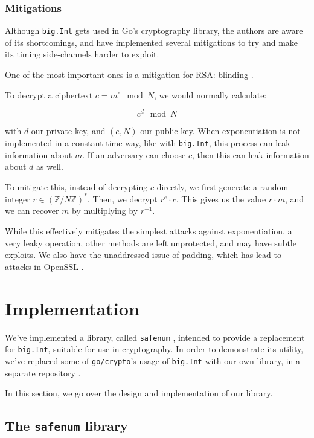 \documentclass[11pt, a4paper]{article} %
\begin{document}
{\subsubsection{Mitigations}

Although \texttt{big.Int} gets used in Go's cryptography library,
the authors are aware of its shortcomings, and have implemented
several mitigations to try and make its timing side-channels harder to
exploit.

One of the most important ones is a mitigation
for RSA: blinding \cite{kocher_timing_1996}.

To decrypt a ciphertext
$c = m^e \mod N$, we would normally calculate:

$$
c^d \mod N
$$

with $d$ our private key, and $(e, N)$ our public key.
When exponentiation is not implemented in a constant-time way, like
with \texttt{big.Int}, this process can leak information about $m$.
If an adversary can choose $c$, then this can leak information about
$d$ as well.

To mitigate this, instead of decrypting $c$ directly,
we first generate a random integer
$r \in (\mathbb{Z}/N\mathbb{Z})^*$. Then, we decrypt $r^e \cdot c$.
This gives us the value $r \cdot m$, and we can recover
$m$ by multiplying by $r^{-1}$.

While this effectively mitigates the simplest attacks
against exponentiation, a very leaky operation,
other methods are left unprotected, and may
have subtle exploits. We also have
the unaddressed issue of padding, which has lead to attacks
in OpenSSL \cite{merget_raccoon_2019}.

\section{Implementation}

We've implemented a library, called
\texttt{safenum} \cite{meier_cronokirbysafenum_2021}, intended to provide
a replacement for \texttt{big.Int}, suitable for use in cryptography.
In order to demonstrate its utility, we've replaced some
of \texttt{go/crypto}'s usage of \texttt{big.Int} with our own library,
in a separate repository
\cite{meier_cronokirbyctcrypto_2021}.

In this section, we go over the design and implementation of our
library.

\subsection{The \texttt{safenum} library}

}
\end{document}
